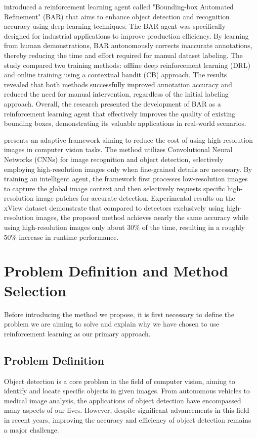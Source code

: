 \documentclass{PHlab-thesis}
\begin{document}
\cite{ayle2020bar} introduced a reinforcement learning agent called "Bounding-box Automated Refinement" (BAR) that aims to enhance object detection and recognition accuracy using deep learning techniques. The BAR agent was specifically designed for industrial applications to improve production efficiency. By learning from human demonstrations, BAR autonomously corrects inaccurate annotations, thereby reducing the time and effort required for manual dataset labeling. The study compared two training methods: offline deep reinforcement learning (DRL) and online training using a contextual bandit (CB) approach. The results revealed that both methods successfully improved annotation accuracy and reduced the need for manual intervention, regardless of the initial labeling approach. Overall, the research presented the development of BAR as a reinforcement learning agent that effectively improves the quality of existing bounding boxes, demonstrating its valuable applications in real-world scenarios.

\cite{uzkent2020efficient} presents an adaptive framework aiming to reduce the cost of using high-resolution images in computer vision tasks. The method utilizes Convolutional Neural Networks (CNNs) for image recognition and object detection, selectively employing high-resolution images only when fine-grained details are necessary. By training an intelligent agent, the framework first processes low-resolution images to capture the global image context and then selectively requests specific high-resolution image patches for accurate detection. Experimental results on the xView dataset demonstrate that compared to detectors exclusively using high-resolution images, the proposed method achieves nearly the same accuracy while using high-resolution images only about 30\% of the time, resulting in a roughly 50\% increase in runtime performance.

\chapter{Problem Definition and Method Selection}
Before introducing the method we propose, it is first necessary to define the problem we are aiming to solve and explain why we have chosen to use reinforcement learning as our primary approach.
\section{Problem Definition}
Object detection is a core problem in the field of computer vision, aiming to identify and locate specific objects in given images. From autonomous vehicles to medical image analysis, the applications of object detection have encompassed many aspects of our lives. However, despite significant advancements in this field in recent years, improving the accuracy and efficiency of object detection remains a major challenge.
\end{document}
